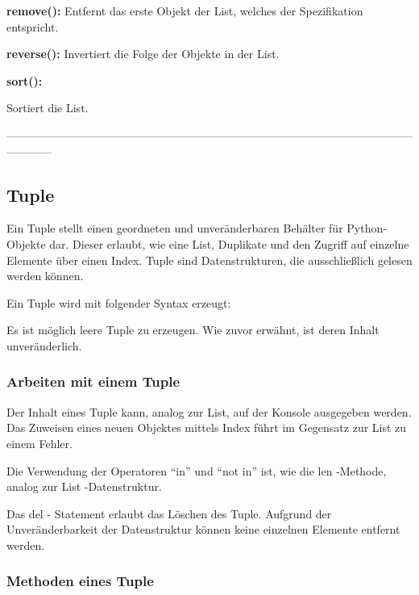 \textbf{remove():}
Entfernt das erste Objekt der List, welches der Spezifikation entspricht.

    
\textbf{reverse():}
Invertiert die Folge der Objekte in der List.


\textbf{sort():}

Sortiert die List.
    
------------------------------------------------------------------------------------------------------------------------
\subsection{Tuple}

Ein Tuple stellt einen geordneten und unveränderbaren Behälter für Python-Objekte dar. Dieser erlaubt, wie eine List, Duplikate und den Zugriff auf einzelne Elemente über einen Index. Tuple sind Datenstrukturen, die ausschließlich gelesen werden können.

Ein Tuple wird mit folgender Syntax erzeugt:



Es ist möglich leere Tuple zu erzeugen. Wie zuvor erwähnt, ist deren Inhalt unveränderlich.

\subsubsection{Arbeiten mit einem Tuple}

Der Inhalt eines Tuple kann, analog zur List, auf der Konsole ausgegeben werden. Das Zuweisen eines neuen Objektes mittels Index führt im Gegensatz zur List zu einem Fehler.

    
Die Verwendung der Operatoren “in” und “not in” ist, wie die len -Methode, analog zur List -Datenstruktur.

    
Das del - Statement erlaubt das Löschen des Tuple. Aufgrund der Unveränderbarkeit der Datenstruktur können keine einzelnen Elemente entfernt werden.

    

\subsubsection{Methoden eines Tuple}

